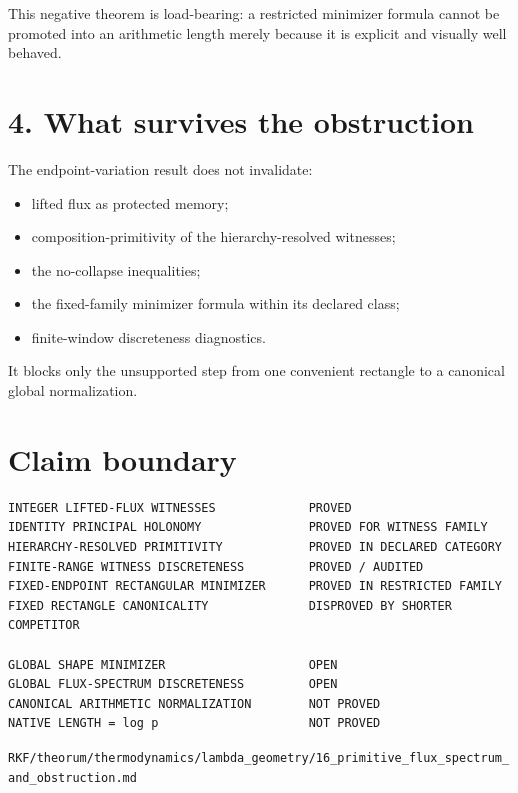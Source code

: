 This negative theorem is load-bearing: a restricted minimizer formula cannot be promoted into an arithmetic length merely because it is explicit and visually well behaved.

\hypertarget{what-survives-the-obstruction}{%
\section{4. What survives the obstruction}\label{what-survives-the-obstruction}}

The endpoint-variation result does not invalidate:

\begin{itemize}
\tightlist
\item
  lifted flux as protected memory;
\item
  composition-primitivity of the hierarchy-resolved witnesses;
\item
  the no-collapse inequalities;
\item
  the fixed-family minimizer formula within its declared class;
\item
  finite-window discreteness diagnostics.
\end{itemize}

It blocks only the unsupported step from one convenient rectangle to a canonical global normalization.

\hypertarget{claim-boundary}{%
\section{Claim boundary}\label{claim-boundary}}

\begin{verbatim}
INTEGER LIFTED-FLUX WITNESSES             PROVED
IDENTITY PRINCIPAL HOLONOMY               PROVED FOR WITNESS FAMILY
HIERARCHY-RESOLVED PRIMITIVITY            PROVED IN DECLARED CATEGORY
FINITE-RANGE WITNESS DISCRETENESS         PROVED / AUDITED
FIXED-ENDPOINT RECTANGULAR MINIMIZER      PROVED IN RESTRICTED FAMILY
FIXED RECTANGLE CANONICALITY              DISPROVED BY SHORTER COMPETITOR

GLOBAL SHAPE MINIMIZER                    OPEN
GLOBAL FLUX-SPECTRUM DISCRETENESS         OPEN
CANONICAL ARITHMETIC NORMALIZATION        NOT PROVED
NATIVE LENGTH = log p                     NOT PROVED
\end{verbatim}

\begin{flushright}\small\texttt{RKF/theorum/thermodynamics/lambda\_geometry/16\_primitive\_flux\_spectrum\_and\_obstruction.md}\end{flushright}
